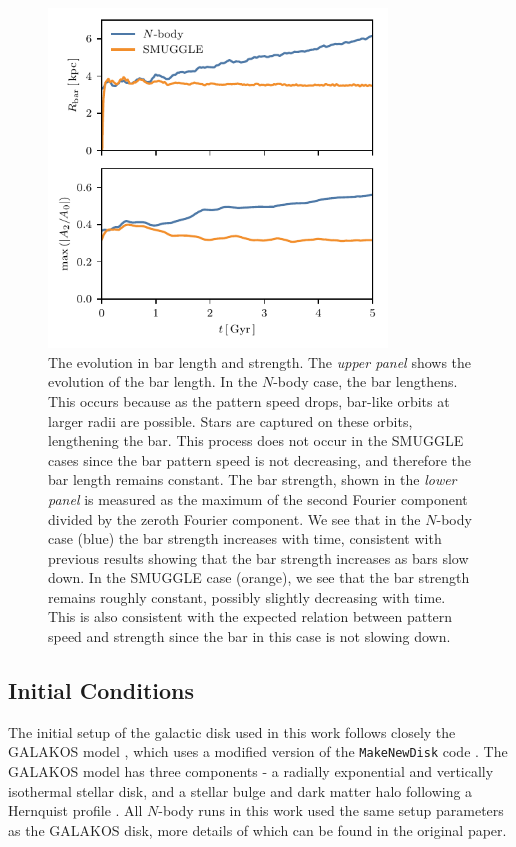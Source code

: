 \documentclass[fleqn,usenatbib]{mnras}
\newcommand{\Nbody}{$N$-body}
\begin{document}
\begin{figure}
    \centering
    \includegraphics[width=9cm]{fig/Rb_A2.pdf}
    \caption{The evolution in bar length and strength. The \textit{upper panel}
    shows the evolution of the bar length. In the \Nbody{} case, the bar
    lengthens. This occurs because as the pattern speed drops, bar-like orbits
    at larger radii are possible. Stars are captured on these orbits,
    lengthening the bar. This process does not occur in the SMUGGLE cases since
    the bar pattern speed is not decreasing, and therefore the bar length
    remains constant. The bar strength, shown in the \textit{lower panel} is
    measured as the maximum of the second Fourier component divided by the
    zeroth Fourier component. We see that in the \Nbody{} case (blue) the bar
    strength increases with time, consistent with previous results showing that
    the bar strength increases as bars slow down. In the SMUGGLE case (orange),
    we see that the bar strength remains roughly constant, possibly slightly
    decreasing with time. This is also consistent with the expected relation
    between pattern speed and strength since the bar in this case is not slowing
    down.}
    \label{fig:strength}
\end{figure}
\subsection{Initial Conditions}
The initial setup of the galactic disk used in this work follows closely the
GALAKOS model \citep{2020ApJ...890..117D}, which uses a modified version of the
\texttt{MakeNewDisk} code \citep{2005MNRAS.361..776S}. The GALAKOS model has
three components - a radially exponential and vertically isothermal stellar
disk, and a stellar bulge and dark matter halo following a Hernquist profile
\citep{1990ApJ...356..359H}. All \Nbody{} runs in this work used the same setup
parameters as the GALAKOS disk, more details of which can be found in the
original paper.
\end{document}
